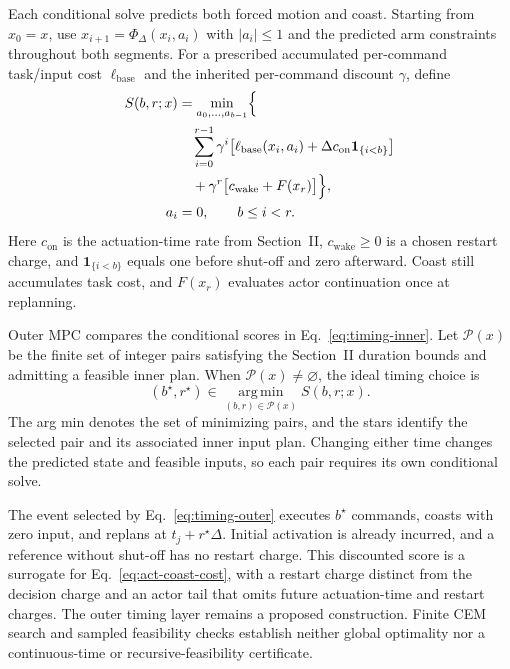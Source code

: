 \documentclass[letterpaper,10pt,conference]{ieeeconf}
\newcommand{\ind}{\mathbf{1}}
\begin{document}
Each conditional solve predicts both forced motion and coast. Starting from $x_0=x$, use $x_{i+1}=\Phi_\Delta(x_i,a_i)$ with $|a_i|\le1$ and the predicted arm constraints throughout both segments. For a prescribed accumulated per-command task/input cost $\ell_{\mathrm{base}}$ and the inherited per-command discount $\gamma$, define
\begin{equation}
\begin{aligned}
 S(b,r;x)&=\min_{a_0,\ldots,a_{b-1}}\Bigl\{\\
 &\quad\sum_{i=0}^{r-1}\gamma^i
 \bigl[\ell_{\mathrm{base}}(x_i,a_i)
       +\Delta c_{\mathrm{on}}\ind_{\{i<b\}}\bigr]\\
 &\quad+\gamma^r\bigl[c_{\mathrm{wake}}+F(x_r)\bigr]\Bigr\},\\
 a_i&=0,\qquad b\le i<r.
\end{aligned}
\label{eq:timing-inner}
\end{equation}
Here $c_{\mathrm{on}}$ is the actuation-time rate from Section~II, $c_{\mathrm{wake}}\ge0$ is a chosen restart charge, and $\ind_{\{i<b\}}$ equals one before shut-off and zero afterward. Coast still accumulates task cost, and $F(x_r)$ evaluates actor continuation once at replanning.

Outer MPC compares the conditional scores in Eq.~\eqref{eq:timing-inner}. Let $\mathcal P(x)$ be the finite set of integer pairs satisfying the Section~II duration bounds and admitting a feasible inner plan. When $\mathcal P(x)\ne\varnothing$, the ideal timing choice is
\begin{equation}
 (b^\star,r^\star)\in
 \operatorname*{arg\,min}_{(b,r)\in\mathcal P(x)}S(b,r;x).
\label{eq:timing-outer}
\end{equation}
The arg min denotes the set of minimizing pairs, and the stars identify the selected pair and its associated inner input plan. Changing either time changes the predicted state and feasible inputs, so each pair requires its own conditional solve.

The event selected by Eq.~\eqref{eq:timing-outer} executes $b^\star$ commands, coasts with zero input, and replans at $t_j+r^\star\Delta$. Initial activation is already incurred, and a reference without shut-off has no restart charge. This discounted score is a surrogate for Eq.~\eqref{eq:act-coast-cost}, with a restart charge distinct from the decision charge and an actor tail that omits future actuation-time and restart charges. The outer timing layer remains a proposed construction. Finite CEM search and sampled feasibility checks establish neither global optimality nor a continuous-time or recursive-feasibility certificate.
\end{document}

